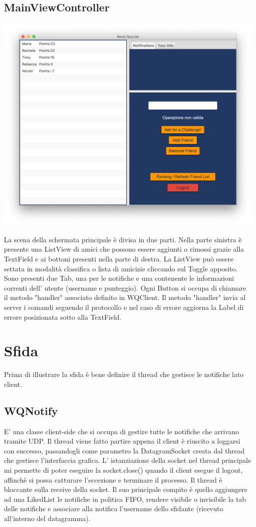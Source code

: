 \documentclass{article}
\begin{document}
\subsection{MainViewController}
\begin{center}
\includegraphics[scale=0.5]{quizzlemain.png}
\end{center}
La scena della schermata principale è divisa in due parti. Nella parte sinistra è presente una ListView di amici che possono essere aggiunti o rimossi grazie alla TextField e ai bottoni presenti nella parte di destra. La ListView può essere settata in modalità classifica o lista di amicizie cliccando sul Toggle apposito. Sono presenti due Tab, una per le notifiche e una contenente le informazioni correnti dell' utente (username e punteggio).
Ogni Button si occupa di chiamare il metodo "handler" associato definito in WQClient. Il metodo "handler" invia al server i comandi seguendo il protocollo e nel caso di errore aggiorna la Label di errore posizionata sotto alla TextField.
\clearpage

\section{Sfida}
Prima di illustrare la sfida è bene definire il thread che gestisce le notifiche lato client.

\subsection{WQNotify}
E' una classe client-side che si occupa di gestire tutte le notifiche che arrivano tramite UDP. Il thread viene fatto partire appena il client è riuscito a loggarsi con successo, passandogli come parametro la DatagramSocket creata dal thread che gestisce l'interfaccia grafica. L' istanziazione della socket nel thread principale mi permette di poter eseguire la socket.close() quando il client esegue il logout, affinchè si possa catturare l'eccezione e terminare il processo. Il thread è bloccante sulla receive della socket. Il suo principale compito è quello aggiungere ad una LikedList le notifiche in politica FIFO, rendere visibile o invisibile la tab delle notifiche e associare alla notifica l'username dello sfidante (ricevuto all'interno del datagramma).
\end{document}

